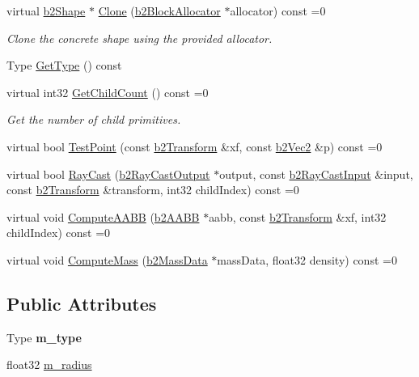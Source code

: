 \begin{DoxyCompactItemize}
\mbox{\label{classb2Shape_a4716243454bb9cf7c7ee1d9cb23ae634}} 
virtual \hyperlink{classb2Shape}{b2\+Shape} $\ast$ \hyperlink{classb2Shape_a4716243454bb9cf7c7ee1d9cb23ae634}{Clone} (\hyperlink{classb2BlockAllocator}{b2\+Block\+Allocator} $\ast$allocator) const =0
\begin{DoxyCompactList}\small\item\em Clone the concrete shape using the provided allocator. \end{DoxyCompactList}\item 
Type \hyperlink{classb2Shape_a605b5f1dd744ea3cf49f20fbde1e3b09}{Get\+Type} () const
\item 
\mbox{\label{classb2Shape_a05a3c445017d96df9238ceefe6ce37ab}} 
virtual int32 \hyperlink{classb2Shape_a05a3c445017d96df9238ceefe6ce37ab}{Get\+Child\+Count} () const =0
\begin{DoxyCompactList}\small\item\em Get the number of child primitives. \end{DoxyCompactList}\item 
virtual bool \hyperlink{classb2Shape_a6ac968e403e2d93e8ae46d728a2e50fa}{Test\+Point} (const \hyperlink{structb2Transform}{b2\+Transform} \&xf, const \hyperlink{structb2Vec2}{b2\+Vec2} \&p) const =0
\item 
virtual bool \hyperlink{classb2Shape_aee53a926f4fe64cd03693f6211ef6335}{Ray\+Cast} (\hyperlink{structb2RayCastOutput}{b2\+Ray\+Cast\+Output} $\ast$output, const \hyperlink{structb2RayCastInput}{b2\+Ray\+Cast\+Input} \&input, const \hyperlink{structb2Transform}{b2\+Transform} \&transform, int32 child\+Index) const =0
\item 
virtual void \hyperlink{classb2Shape_a88e9807fab0c8ca9a98d8926e50a1411}{Compute\+A\+A\+BB} (\hyperlink{structb2AABB}{b2\+A\+A\+BB} $\ast$aabb, const \hyperlink{structb2Transform}{b2\+Transform} \&xf, int32 child\+Index) const =0
\item 
virtual void \hyperlink{classb2Shape_a61b365526241b47f124789b0309cac69}{Compute\+Mass} (\hyperlink{structb2MassData}{b2\+Mass\+Data} $\ast$mass\+Data, float32 density) const =0
\end{DoxyCompactItemize}
\subsection*{Public Attributes}
\begin{DoxyCompactItemize}
\item 
\mbox{\label{classb2Shape_adb051791133b24f53c6e9a565a7b7bbb}} 
Type {\bfseries m\+\_\+type}
\item 
float32 \hyperlink{classb2Shape_a5de7a9bd3f9e72ef7025a65c304aaf1a}{m\+\_\+radius}
\end{DoxyCompactItemize}


